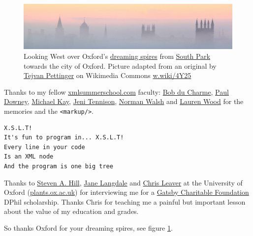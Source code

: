 \documentclass[
]{book}
\begin{document}
\begin{figure}

{\centering \includegraphics[width=1\linewidth]{images/dreaming-spires-oxford-sunrise} 

}

\caption{Looking West over Oxford's \href{https://en.wikipedia.org/wiki/Thyrsis_(poem)}{dreaming spires} from \href{https://en.wikipedia.org/wiki/South_Park,_Oxford}{South Park} towards the city of Oxford. Picture adapted from an original by \href{https://en.wikipedia.org/wiki/Tejvan_Pettinger}{Tejvan Pettinger} on Wikimedia Commons \href{https://w.wiki/4Y25}{w.wiki/4Y25}}\label{fig:oxford-fig}
\end{figure}

Thanks to my fellow \href{https://xmlsummerschool.com/}{xmlsummerschool.com} faculty: \href{https://www.bobdc.com/blog/}{Bob du Charme}, \href{https://twitter.com/psd}{Paul Downey}, \href{https://en.wikipedia.org/wiki/Michael_Howard_Kay}{Michael Kay}, \href{https://en.wikipedia.org/wiki/Jeni_Tennison}{Jeni Tennison}, \href{https://norman.walsh.name/}{Norman Walsh} and \href{https://www.laurenwood.org/}{Lauren Wood} for the memories and the \texttt{\textless{}markup/\textgreater{}}. \citep{xslt, ymca}

\begin{verbatim}
X.S.L.T!
It's fun to program in... X.S.L.T!
Every line in your code
Is an XML node
And the program is one big tree
\end{verbatim}



Thanks to \href{https://en.wikipedia.org/wiki/Steven_A._Hill}{Steven A. Hill}, \href{https://en.wikipedia.org/wiki/Jane_A._Langdale}{Jane Langdale} and \href{https://en.wikipedia.org/wiki/Chris_J._Leaver}{Chris Leaver} at the University of Oxford (\href{https://www.plants.ox.ac.uk/}{plants.ox.ac.uk}) for interviewing me for a \href{https://www.gatsby.org.uk/about-gatsby}{Gatsby Charitable Foundation} DPhil scholarship. Thanks Chris for teaching me a painful but important lesson about the value of my education and grades.

So thanks Oxford for your dreaming spires, see figure \ref{fig:oxford-fig}. 🙏
\end{document}
